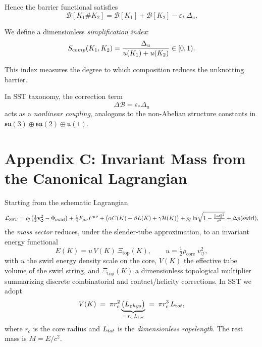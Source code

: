 \documentclass[11pt]{article}
\begin{document}
Hence the barrier functional satisfies
\[
    \mathcal B[K_1 \# K_2]
    = \mathcal B[K_1] + \mathcal B[K_2] - \varepsilon_*\,\Delta_u.
\]

We define a dimensionless \emph{simplification index}:
\[
    S_{\textrm comp}(K_1,K_2)
    = \frac{\Delta_u}{u(K_1)+u(K_2)} \in [0,1).
\]

This index measures the degree to which composition
reduces the unknotting barrier.

\medskip

In SST taxonomy, the correction term
\[
    \Delta\mathcal B = \varepsilon_* \Delta_u
\]
acts as a \emph{nonlinear coupling},
analogous to the non-Abelian structure constants
in $\mathfrak{su}(3)\oplus\mathfrak{su}(2)\oplus\mathfrak{u}(1)$.



\section*{Appendix C: Invariant Mass from the Canonical Lagrangian}

Starting from the schematic Lagrangian
\[
    \mathcal{L}_{\text{SST}}
    = \rhof\!\left(\tfrac{1}{2}\vswirl^2 - \Phi_{\text{swirl}}\right)
    + \tfrac{1}{4}F_{\mu\nu}F^{\mu\nu}
    + \big(\alpha C(K)+\beta L(K)+\gamma \mathcal{H}(K)\big)
    + \rhof \ln\!\sqrt{1-\tfrac{\|\boldsymbol\omega\|^2}{c^2}}
    + \Delta p(\text{swirl}),
\]
the \emph{mass sector} reduces, under the slender-tube approximation, to an invariant energy functional
\[
    E(K)= u\,V(K)\,\Xi_{\text{top}}(K),\qquad
    u=\tfrac{1}{2}\rho_{\text{core}}\;v_{\circlearrowleft}^{2},
\]
with $u$ the swirl energy density scale on the core, $V(K)$ the effective tube volume of the swirl string, and $\Xi_{\text{top}}(K)$ a dimensionless topological multiplier summarizing discrete combinatorial and contact/helicity corrections. In SST we adopt
\[
    V(K)\;=\;\pi r_c^2 \underbrace{\big(L_{\textrm phys}\big)}_{=\,r_c\,L_{\textrm tot}}
    \;=\;\pi r_c^3\,L_{\textrm tot},
\]
where $r_c$ is the core radius and $L_{\textrm tot}$ is the \emph{dimensionless ropelength}. The rest mass is $M=E/c^2$.
\end{document}
